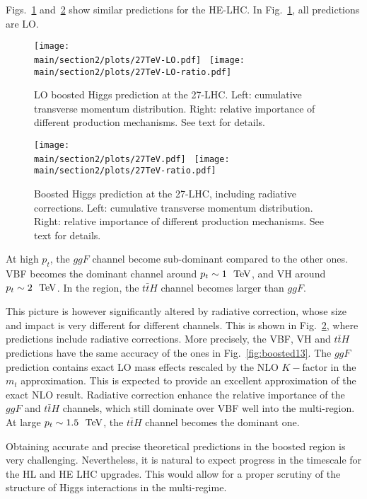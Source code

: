 Figs.~\ref{fig:boosted27-LO} and~\ref{fig:boosted27} show similar predictions for the HE-LHC. In Fig.~\ref{fig:boosted27-LO}, all predictions are LO. 
\begin{figure}[h]
\begin{center}
    \texttt{[image: \\main/section2/plots/27TeV-LO.pdf]}~
    \texttt{[image: \\main/section2/plots/27TeV-LO-ratio.pdf]}
    \caption{
    LO boosted Higgs prediction at the 27-\UTeV LHC. Left: cumulative transverse momentum distribution.
    Right: relative importance of different production mechanisms. See text for details. 
        \label{fig:boosted27-LO}}
        \end{center}
\end{figure}
\begin{figure}[h]
\begin{center}
    \texttt{[image: \\main/section2/plots/27TeV.pdf]}~
    \texttt{[image: \\main/section2/plots/27TeV-ratio.pdf]}
    \caption{
    Boosted Higgs prediction at the 27-\UTeV LHC, including radiative corrections. Left: cumulative transverse momentum distribution.
    Right: relative importance of different production mechanisms. See text for details. 
        \label{fig:boosted27}}
        \end{center}
\end{figure}
At high $p_t$, the $ggF$ channel become sub-dominant compared to the other ones. VBF becomes the dominant channel around  $p_t\sim 1~{\rm ~\text{TeV}}$, 
and VH around $p_t\sim 2~{\rm ~\text{TeV}}$. In the \UTeV region, the $t\bar t H$ channel becomes larger than $ggF$. 

This picture is however significantly altered by radiative correction, whose size and impact is very different for different channels. 
This is shown in Fig.~\ref{fig:boosted27}, where predictions include radiative corrections. More precisely, the VBF, VH and $t\bar t H$ 
predictions have the same accuracy of the ones in Fig.~\ref{fig:boosted13}. The $ggF$ prediction contains exact LO mass effects rescaled
by the NLO $K-$factor in the $m_t$ approximation. This is expected to provide an excellent approximation of the exact NLO result. 
Radiative correction enhance the relative importance of the $ggF$ and $t\bar t H$ channels, which still dominate over VBF well into the
multi-\UTeV region. At large $p_t \sim 1.5~{\rm ~\text{TeV}}$, the $t\bar t H$ channel becomes the dominant one. 

Obtaining accurate and precise theoretical predictions in the boosted region is very challenging. Nevertheless, it is natural
to expect progress in the timescale for the HL and HE LHC upgrades. This would allow for a proper scrutiny of the structure of
Higgs interactions in the multi-\UTeV regime. 

